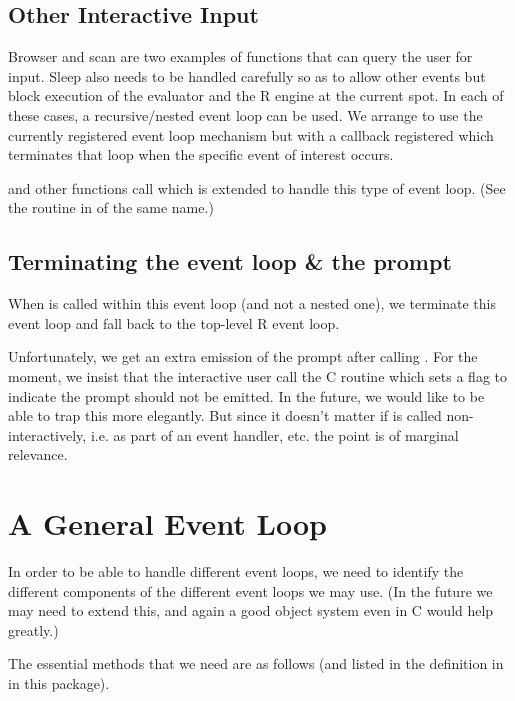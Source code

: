 \documentclass{article}
\begin{document}
\subsection{Other Interactive Input}
Browser and scan are two examples of functions that can query the user
for input.  Sleep also needs to be handled carefully so as to allow
other events but block execution of the evaluator and the R engine at
the current spot.  In each of these cases, a recursive/nested event
loop can be used. We arrange to use the currently registered event
loop mechanism but with a callback registered which terminates that
loop when the specific event of interest occurs. 


 and other functions call 
which is extended to handle this type of event loop.  (See the routine
in  of the same name.)


\subsection{Terminating the event loop \& the prompt}

When  is called within this event loop (and
not a nested one), we terminate this event loop and fall back to the
top-level R event loop.

Unfortunately, we get an extra emission of the prompt after calling
.  For the moment, we insist that the
interactive user call the C routine  which
sets a flag to indicate the prompt should not be emitted. In the
future, we would like to be able to trap this more elegantly.  But
since it doesn't matter if  is called
non-interactively, i.e. as part of an event handler, etc.  the point
is of marginal relevance.


\section{A General Event Loop}
In order to be able to handle different event loops, we need to
identify the different components of the different event loops we may
use.  (In the future we may need to extend this, and again a good
object system even in C would help greatly.)

The essential methods that we need are as follows
(and listed in the 
definition in  in this package).
\end{document}
